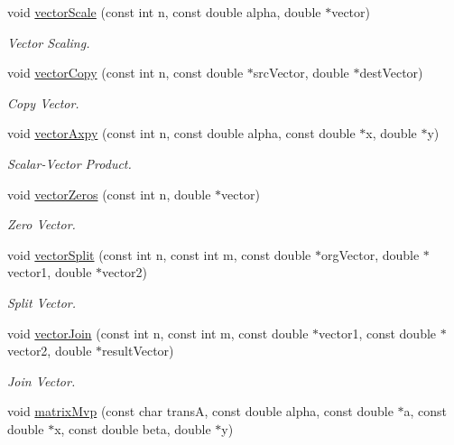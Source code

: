\begin{CompactItemize}
void \hyperlink{group__a_g97fc3b2e8bbe3973ac8fe0c122807b89}{vectorScale} (const int n, const double alpha, double $\ast$vector)
\begin{CompactList}\small\item\em Vector Scaling. \item\end{CompactList}\item 
void \hyperlink{group__a_g08d2c57a110ec57f89669160ae1fd089}{vectorCopy} (const int n, const double $\ast$srcVector, double $\ast$destVector)
\begin{CompactList}\small\item\em Copy Vector. \item\end{CompactList}\item 
void \hyperlink{group__a_g3498940945f9d5437032454f4838350c}{vectorAxpy} (const int n, const double alpha, const double $\ast$x, double $\ast$y)
\begin{CompactList}\small\item\em Scalar-Vector Product. \item\end{CompactList}\item 
void \hyperlink{group__a_g36d84832e6a52057a4519e003d299e95}{vectorZeros} (const int n, double $\ast$vector)
\begin{CompactList}\small\item\em Zero Vector. \item\end{CompactList}\item 
void \hyperlink{group__a_g04a15ca8e56a12b927b5408ce191795a}{vectorSplit} (const int n, const int m, const double $\ast$orgVector, double $\ast$vector1, double $\ast$vector2)
\begin{CompactList}\small\item\em Split Vector. \item\end{CompactList}\item 
void \hyperlink{group__a_gc00ab414706bc82820e985055f285f3b}{vectorJoin} (const int n, const int m, const double $\ast$vector1, const double $\ast$vector2, double $\ast$resultVector)
\begin{CompactList}\small\item\em Join Vector. \item\end{CompactList}\item 
void \hyperlink{group__a_g097b52024b56996c79e5c8767afd66ae}{matrixMvp} (const char transA, const double alpha, const double $\ast$a, const double $\ast$x, const double beta, double $\ast$y)

\end{CompactItemize}

